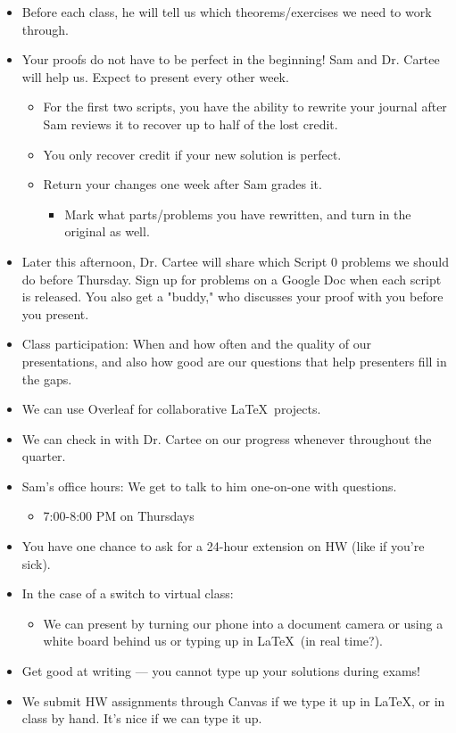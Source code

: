 \documentclass[../main.tex]{subfiles}
\begin{document}
\begin{itemize}
    \item Before each class, he will tell us which theorems/exercises we need to work through.
    \item Your proofs do not have to be perfect in the beginning! Sam and Dr. Cartee will help us. Expect to present every other week.
    \begin{itemize}
        \item For the first two scripts, you have the ability to rewrite your journal after Sam reviews it to recover up to half of the lost credit.
        \item You only recover credit if your new solution is perfect.
        \item Return your changes one week after Sam grades it.
        \begin{itemize}
            \item Mark what parts/problems you have rewritten, and turn in the original as well.
        \end{itemize}
    \end{itemize}
    \item Later this afternoon, Dr. Cartee will share which Script 0 problems we should do before Thursday. Sign up for problems on a Google Doc when each script is released. You also get a "buddy," who discusses your proof with you before you present.
    \item Class participation: When and how often and the quality of our presentations, and also how good are our questions that help presenters fill in the gaps.
    \item We can use Overleaf for collaborative \LaTeX\ projects.
    \item We can check in with Dr. Cartee on our progress whenever throughout the quarter.
    \item Sam's office hours: We get to talk to him one-on-one with questions.
    \begin{itemize}
        \item 7:00-8:00 PM on Thursdays
    \end{itemize}
    \item You have one chance to ask for a 24-hour extension on HW (like if you're sick).
    \item In the case of a switch to virtual class:
    \begin{itemize}
        \item We can present by turning our phone into a document camera or using a white board behind us or typing up in \LaTeX\ (in real time?).
    \end{itemize}
    \item Get good at writing --- you cannot type up your solutions during exams!
    \item We submit HW assignments through Canvas if we type it up in \LaTeX, or in class by hand. It's nice if we can type it up.
\end{itemize}
\end{document}
